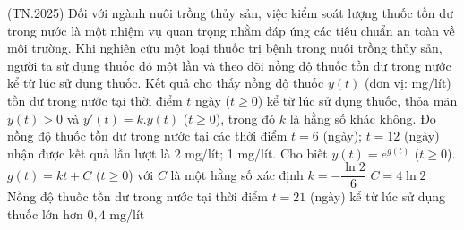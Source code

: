 \begin{ex} %
 	(TN.2025) Đối với ngành nuôi trồng thủy sản, việc kiểm soát lượng thuốc tồn dư trong nước là một nhiệm vụ quan trọng nhằm đáp ứng các tiêu chuẩn an toàn về môi trường. Khi nghiên cứu một loại thuốc trị bệnh trong nuôi trồng thủy sản, người ta sử dụng thuốc đó một lần và theo dõi nồng độ thuốc tồn dư trong nước kể từ lúc sử dụng thuốc. Kết quả cho thấy nồng độ thuốc $y\left( t \right)$ (đơn vị: mg/lít) tồn dư trong nước tại thời điểm $t$ ngày ($t \geqslant 0$) kể từ lúc sử dụng thuốc, thỏa mãn $y\left( t \right) > 0$ và $y'\left( t \right) = k.y\left( t \right)$ ($t \geqslant 0$), trong đó $k$ là hằng số khác không. Đo nồng độ thuốc tồn dư trong nước tại các thời điểm $t = 6$ (ngày); $t = 12$ (ngày) nhận được kết quả lần lượt là 2 mg/lít; 1 mg/lít. Cho biết $y\left( t \right) = {e^{g\left( t \right)}}$ ($t \geqslant 0$).
 	\choiceTF
 	{\True $g\left( t \right) = kt + C$ ($t \geqslant 0$) với $C$ là một hằng số xác định}
 	{\True $k =  - \dfrac{{\ln 2}}{6}$}
 	{$C = 4\ln 2$}
 	{Nồng độ thuốc tồn dư trong nước tại thời điểm $t = 21$ (ngày) kể từ lúc sử dụng thuốc lớn hơn $0,4$ mg/lít}
\end{ex}
